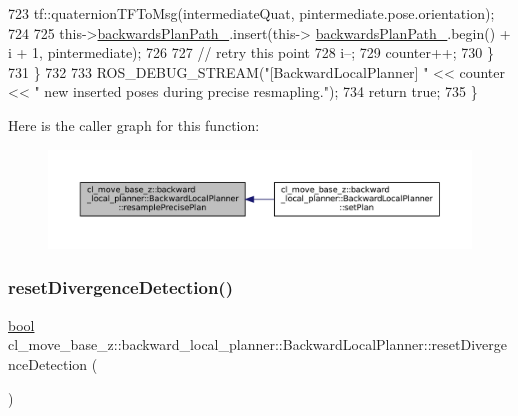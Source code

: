 \begin{DoxyCode}
723                     tf::quaternionTFToMsg(intermediateQuat, pintermediate.pose.orientation);
724 
725                     this->\hyperlink{classcl__move__base__z_1_1backward__local__planner_1_1BackwardLocalPlanner_ad9cde5c85f782cab2ddb4030e3c3f2cf}{backwardsPlanPath\_}.insert(this->
      \hyperlink{classcl__move__base__z_1_1backward__local__planner_1_1BackwardLocalPlanner_ad9cde5c85f782cab2ddb4030e3c3f2cf}{backwardsPlanPath\_}.begin() + i + 1, pintermediate);
726 
727                     \textcolor{comment}{// retry this point}
728                     i--;
729                     counter++;
730                 \}
731             \}
732 
733             ROS\_DEBUG\_STREAM(\textcolor{stringliteral}{"[BackwardLocalPlanner] "} << counter << \textcolor{stringliteral}{" new inserted poses during precise
       resmapling."});
734             \textcolor{keywordflow}{return} \textcolor{keyword}{true};
735         \}
\end{DoxyCode}
Here is the caller graph for this function\+:
\nopagebreak
\begin{figure}[H]
\begin{center}
\leavevmode
\includegraphics[width=350pt]{classcl__move__base__z_1_1backward__local__planner_1_1BackwardLocalPlanner_a100fe8bdaaf89b0fa54ecf2aef0966ed_icgraph}
\end{center}
\end{figure}
\mbox{\label{classcl__move__base__z_1_1backward__local__planner_1_1BackwardLocalPlanner_a35832ebefc43e5977e1222389244c8d3}} 
\subsubsection{\texorpdfstring{reset\+Divergence\+Detection()}{resetDivergenceDetection()}}
{\footnotesize\ttfamily \hyperlink{classbool}{bool} cl\+\_\+move\+\_\+base\+\_\+z\+::backward\+\_\+local\+\_\+planner\+::\+Backward\+Local\+Planner\+::reset\+Divergence\+Detection (\begin{DoxyParamCaption}{ }\end{DoxyParamCaption})\hspace{0.3cm}{\ttfamily [private]}}



